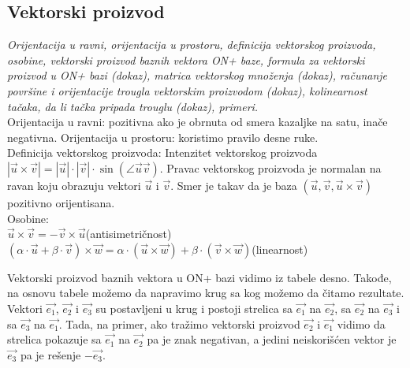 \documentclass[12pt]{article}
\newcommand{\vek}[1]{\overrightarrow{#1}}
\begin{document}
    \subsection{Vektorski proizvod}
    \textit{Orijentacija u ravni, orijentacija u prostoru, definicija vektorskog proizvoda, osobine,
        vektorski proizvod baznih vektora ON+ baze, formula za vektorski
        proizvod u ON+ bazi (dokaz), matrica vektorskog množenja (dokaz),
        računanje površine i orijentacije trougla vektorskim proizvodom
        (dokaz), kolinearnost tačaka, da li tačka pripada trouglu (dokaz),
        primeri.
    }\\[1cm]
    Orijentacija u ravni: pozitivna ako je obrnuta od smera kazaljke na satu, inače negativna.
    Orijentacija u prostoru: koristimo pravilo desne ruke.\\
    Definicija vektorskog proizvoda: Intenzitet vektorskog proizvoda $|\vek{u}\times\vek{v}|=|\vek{u}|\cdot|\vek{v}|\cdot\sin(\angle
\vek{u}\vek{v})$. Pravac vektorskog proizvoda je normalan na ravan koju obrazuju vektori $\vek{u}$ i $\vek{v}$. Smer je takav
    da je baza $(\vek{u}, \vek{v}, \vek{u}\times\vek{v})$ pozitivno orijentisana.\\
    Osobine:\\
$\vek{u}\times\vek{v}=-\vek{v}\times\vek{u}$\hspace*{1cm}(antisimetričnost)\\
$(\alpha\cdot\vek{u}+\beta\cdot\vek{v})\times\vek{w}=\alpha\cdot(\vek{u}\times\vek{w})+\beta\cdot(\vek{v}\times\vek{w})$\hspace*{1cm}(linearnost)
    \\[0.5cm]
    \noindent
    \begin{minipage}{0.65\textwidth}
        \begin{flushleft}
            Vektorski proizvod baznih vektora u ON+ bazi vidimo iz tabele desno.
            Takođe, na osnovu tabele možemo da napravimo krug sa kog možemo da čitamo rezultate.
            Vektori $\vek{e_1}$, $\vek{e_2}$ i $\vek{e_3}$
            su postavljeni u krug i postoji strelica sa $\vek{e_1}$ na $\vek{e_2}$,
            sa $\vek{e_2}$ na $\vek{e_3}$ i sa $\vek{e_3}$ na $\vek{e_1}$.
            Tada, na primer, ako tražimo vektorski proizvod $\vek{e_2}$ i $\vek{e_1}$ vidimo da strelica
            pokazuje sa $\vek{e_1}$ na $\vek{e_2}$ pa je znak negativan, a jedini neiskorišćen vektor je
            $\vek{e_3}$ pa je rešenje $-\vek{e_3}$.
        \end{flushleft}
    \end{minipage}
\end{document}
